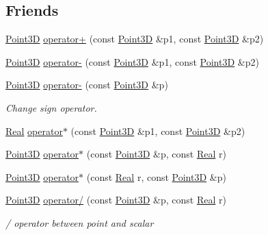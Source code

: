 \subsection*{Friends}
\begin{DoxyCompactItemize}
\item 
\hyperlink{classFVCode3D_1_1Point3D}{Point3D} \hyperlink{classFVCode3D_1_1Point3D_afa00949f6fabb0d42278788f592081f6}{operator+} (const \hyperlink{classFVCode3D_1_1Point3D}{Point3D} \&p1, const \hyperlink{classFVCode3D_1_1Point3D}{Point3D} \&p2)
\item 
\hyperlink{classFVCode3D_1_1Point3D}{Point3D} \hyperlink{classFVCode3D_1_1Point3D_ac10f2fc19824d0e150edb94b21eb75cd}{operator-\/} (const \hyperlink{classFVCode3D_1_1Point3D}{Point3D} \&p1, const \hyperlink{classFVCode3D_1_1Point3D}{Point3D} \&p2)
\item 
\hyperlink{classFVCode3D_1_1Point3D}{Point3D} \hyperlink{classFVCode3D_1_1Point3D_af0fe4c83e3094e9f73de5c8541a7b800}{operator-\/} (const \hyperlink{classFVCode3D_1_1Point3D}{Point3D} \&p)
\begin{DoxyCompactList}\small\item\em Change sign operator. \end{DoxyCompactList}\item 
\hyperlink{namespaceFVCode3D_a40c1f5588a248569d80aa5f867080e83}{Real} \hyperlink{classFVCode3D_1_1Point3D_a43789e877280ec157cdf1ee6abe5cdc4}{operator$\ast$} (const \hyperlink{classFVCode3D_1_1Point3D}{Point3D} \&p1, const \hyperlink{classFVCode3D_1_1Point3D}{Point3D} \&p2)
\item 
\hyperlink{classFVCode3D_1_1Point3D}{Point3D} \hyperlink{classFVCode3D_1_1Point3D_ab47540dec82a8221068ed10ffbc19481}{operator$\ast$} (const \hyperlink{classFVCode3D_1_1Point3D}{Point3D} \&p, const \hyperlink{namespaceFVCode3D_a40c1f5588a248569d80aa5f867080e83}{Real} r)
\item 
\hyperlink{classFVCode3D_1_1Point3D}{Point3D} \hyperlink{classFVCode3D_1_1Point3D_a992195935c2d83ef35a975b66a9d3392}{operator$\ast$} (const \hyperlink{namespaceFVCode3D_a40c1f5588a248569d80aa5f867080e83}{Real} r, const \hyperlink{classFVCode3D_1_1Point3D}{Point3D} \&p)
\item 
\hyperlink{classFVCode3D_1_1Point3D}{Point3D} \hyperlink{classFVCode3D_1_1Point3D_a901cc35e13a74a226e0bce161dd9e03e}{operator/} (const \hyperlink{classFVCode3D_1_1Point3D}{Point3D} \&p, const \hyperlink{namespaceFVCode3D_a40c1f5588a248569d80aa5f867080e83}{Real} r)
\begin{DoxyCompactList}\small\item\em / operator between point and scalar \end{DoxyCompactList}\item 

\end{DoxyCompactItemize}
